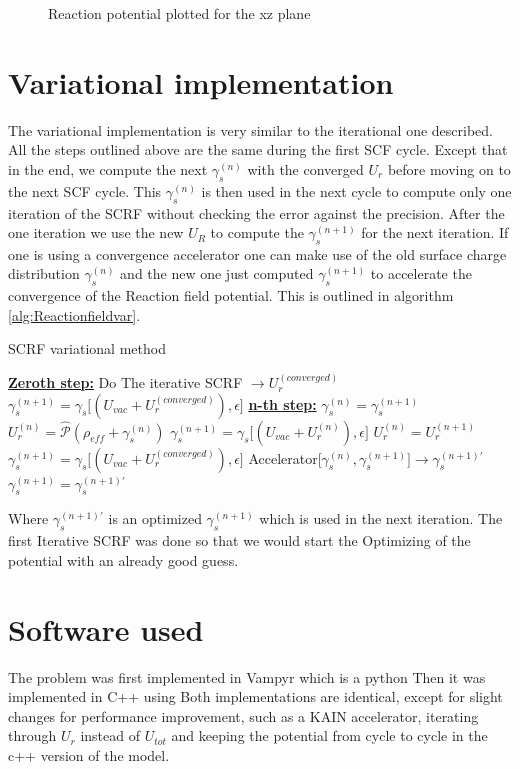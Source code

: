 \documentclass[../master_thesis.tex]{subfiles}
\begin{document}
\begin{figure}[h!]
\begin{subfigure}[b]{\linewidth}
  \end{subfigure}
  \caption{Reaction potential plotted for the xz plane}
  \label{fig:watpots}
\end{figure}

\section{Variational implementation}
The variational implementation is very similar to the iterational one described.
All the steps outlined above are the same during the first \ac{SCF} cycle. Except
that in the end, we compute the next $\gamma_s^{(n)}$ with the converged $U_r$ before
moving on to the next \ac{SCF} cycle. This $\gamma_s^{(n)}$ is then used in the next cycle
to compute only one iteration of the \ac{SCRF} without checking the error against the
precision. After the one iteration we use the new $U_R$ to compute the $\gamma_s^{(n+1)}$
for the next iteration. If one is using a convergence accelerator one can make
use of the old surface charge distribution $\gamma_s^{(n)}$ and the new one just computed
$\gamma_s^{(n+1)}$ to accelerate the convergence of the Reaction field potential.
This is outlined in algorithm \ref{alg:Reactionfieldvar}.
\begin{algorithm}
  \caption{\ac{SCRF} variational method}\label{alg:Reactionfieldvar}
  \begin{algorithmic}
    \STATE \underline{\textbf{Zeroth step:}}
    \STATE Do The iterative \ac{SCRF} $\rightarrow U_r^{(converged)}$
    \STATE $\gamma_s^{(n+1)} = \gamma_s\big[(U_{vac}+ U_r^{(converged)}), \epsilon\big]$
    \STATE \underline{\textbf{n-th step:}}
      \STATE $\gamma_s^{(n)} =\gamma_s^{(n+1)}$
      \STATE $U_r^{(n)} = \hat{\mathscr{P}} (\rho_{eff} + \gamma_s^{(n)})$
      \STATE $\gamma_s^{(n+1)} = \gamma_s\big[(U_{vac}+ U_r^{(n)}), \epsilon\big]$
      \STATE $U_r^{(n)} = U_r^{(n+1)}$
      \STATE $\gamma_s^{(n+1)} = \gamma_s\big[(U_{vac}+ U_r^{(converged)}), \epsilon\big]$
      \STATE Accelerator[$\gamma_s^{(n)}, \gamma_s^{(n+1)}] \rightarrow \gamma_s^{(n+1)\prime}$
      \STATE $\gamma_s^{(n+1)} =\gamma_s^{(n+1)\prime}$
    \ENDFOR
  \end{algorithmic}
\end{algorithm}
Where $\gamma_s^{(n+1)\prime}$ is an optimized $\gamma_s^{(n+1)}$ which is used
in the next iteration. The first Iterative \ac{SCRF} was done so that we would
start the Optimizing of the potential with an already good guess.
\section{Software used}
The problem was first implemented in Vampyr %
which is a python %
Then it was implemented in C++ using \mrchem %
Both implementations are identical, except for slight changes for
performance improvement, such as a KAIN accelerator, %
iterating through $U_r$ instead of $U_{tot}$ %
and keeping the potential from cycle to cycle
in the c++ version of the model.



\biblio
\end{document}
